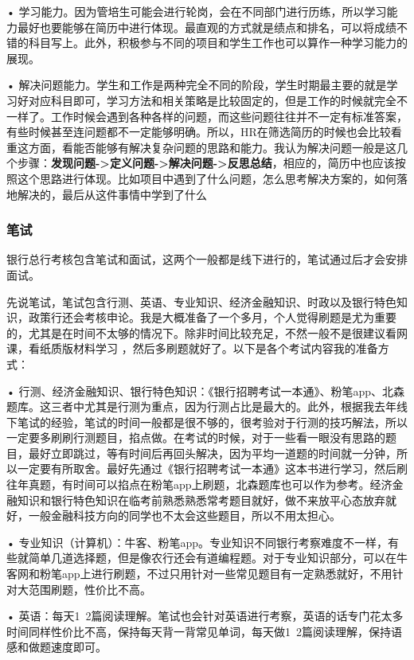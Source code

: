 •	学习能力。因为管培生可能会进行轮岗，会在不同部门进行历练，所以学习能力最好也要能够在简历中进行体现。最直观的方式就是绩点和排名，可以将成绩不错的科目写上。此外，积极参与不同的项目和学生工作也可以算作一种学习能力的展现。

•	解决问题能力。学生和工作是两种完全不同的阶段，学生时期最主要的就是学习好对应科目即可，学习方法和相关策略是比较固定的，但是工作的时候就完全不一样了。工作时候会遇到各种各样的问题，而这些问题往往并不一定有标准答案，有些时候甚至连问题都不一定能够明确。所以，HR在筛选简历的时候也会比较看重这方面，看能否能够有解决复杂问题的思路和能力。我认为解决问题一般是这几个步骤：\textbf{发现问题->定义问题->解决问题->反思总结}，相应的，简历中也应该按照这个思路进行体现。比如项目中遇到了什么问题，怎么思考解决方案的，如何落地解决的，最后从这件事情中学到了什么

\subsubsection{笔试}

银行总行考核包含笔试和面试，这两个一般都是线下进行的，笔试通过后才会安排面试。

先说笔试，笔试包含行测、英语、专业知识、经济金融知识、时政以及银行特色知识，政策行还会考核申论。我是大概准备了一个多月，个人觉得刷题是尤为重要的，尤其是在时间不太够的情况下。除非时间比较充足，不然一般不是很建议看网课，看纸质版材料学习 ，然后多刷题就好了。以下是各个考试内容我的准备方式：

•	行测、经济金融知识、银行特色知识：《银行招聘考试一本通》、粉笔app、北森题库。这三者中尤其是行测为重点，因为行测占比是最大的。此外，根据我去年线下笔试的经验，笔试的时间一般都是很不够的，很考验对于行测的技巧解法，所以一定要多刷刷行测题目，掐点做。在考试的时候，对于一些看一眼没有思路的题目，最好立即跳过，等有时间后再回头解决，因为平均一道题的时间就一分钟，所以一定要有所取舍。最好先通过《银行招聘考试一本通》这本书进行学习，然后刷往年真题，有时间可以掐点在粉笔app上刷题，北森题库也可以作为参考。经济金融知识和银行特色知识在临考前熟悉熟悉常考题目就好，做不来放平心态放弃就好，一般金融科技方向的同学也不太会这些题目，所以不用太担心。

•	专业知识（计算机）：牛客、粉笔app。专业知识不同银行考察难度不一样，有些就简单几道选择题，但是像农行还会有道编程题。对于专业知识部分，可以在牛客网和粉笔app上进行刷题，不过只用针对一些常见题目有一定熟悉就好，不用针对大范围刷题，性价比不高。

•	英语：每天1~2篇阅读理解。笔试也会针对英语进行考察，英语的话专门花太多时间同样性价比不高，保持每天背一背常见单词，每天做1~2篇阅读理解，保持语感和做题速度即可。

